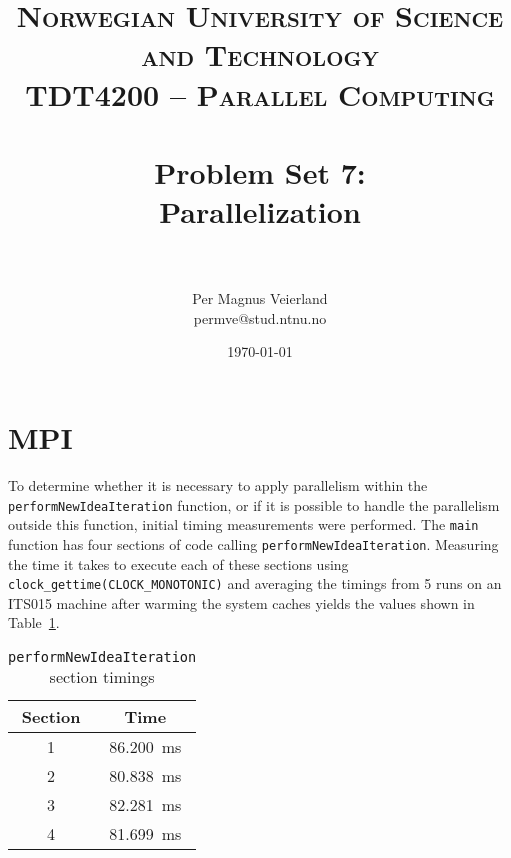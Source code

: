 

\usepackage[htt]{hyphenat}

\title{
\normalfont \normalsize
\textsc{Norwegian University of Science and Technology\\TDT4200 -- Parallel Computing} \\ [25pt]
\horrule{0.5pt} \\[0.4cm]
\huge Problem Set 7:\\ Parallelization\\
\horrule{2pt} \\[0.5cm]
}

\author{Per Magnus Veierland\\permve@stud.ntnu.no}


\date{\normalsize\today}




\maketitle

\section*{\ac{MPI}}

To determine whether it is necessary to apply parallelism within the \texttt{performNewIdeaIteration} function, or if it is possible to handle the parallelism outside this function, initial timing measurements were performed. The \texttt{main} function has four sections of code calling \texttt{performNewIdeaIteration}. Measuring the time it takes to execute each of these sections using \texttt{clock\_gettime(CLOCK\_MONOTONIC)} and averaging the timings from 5 runs on an \textsc{ITS015} machine after warming the system caches yields the values shown in Table~\ref{table:mpiz}.

\begin{table}
\centering
\begin{tabular}{cc}
\toprule
Section & Time \\
\midrule
1 & 86.200~ms \\
2 & 80.838~ms \\
3 & 82.281~ms \\
4 & 81.699~ms\\
\bottomrule
\end{tabular}
\caption{\texttt{performNewIdeaIteration} section timings}
\label{table:mpiz}
\end{table}

